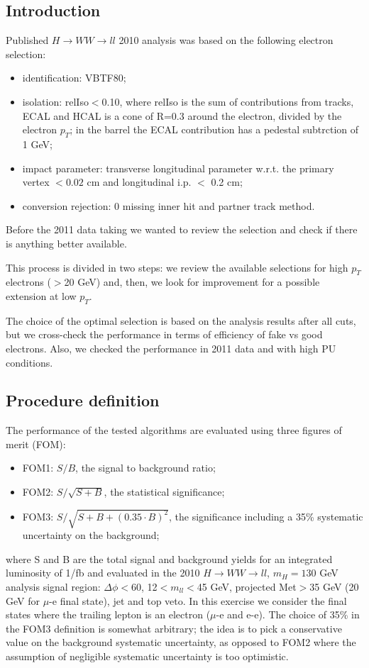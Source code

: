 \subsection{Introduction}
Published $H\rightarrow WW\rightarrow ll$ 2010 analysis was based on the following electron selection:
\begin{itemize}
\item identification: VBTF80;
\item isolation: relIso$<$0.10, where relIso is the sum of contributions from tracks, ECAL and HCAL is a cone of R=0.3 around the electron, 
divided by the electron $p_T$; in the barrel the ECAL contribution has a pedestal subtrction of 1 GeV;
\item impact parameter: transverse longitudinal parameter w.r.t. the primary vertex $<0.02$ cm and longitudinal i.p. $<$ 0.2 cm;
\item conversion rejection: 0 missing inner hit and partner track method.
\end{itemize}
Before the 2011 data taking we wanted to review the selection and check if there is anything better available.

This process is divided in two steps: we review the available selections for high $p_T$ electrons ($>$20 GeV) and, then, 
we look for improvement for a possible extension at low $p_T$.

The choice of the optimal selection is based on the analysis results after all cuts, 
but we cross-check the performance in terms of efficiency of fake vs good electrons.
Also, we checked the performance in 2011 data and with high PU conditions.

\subsection{Procedure definition}
The performance of the tested algorithms are evaluated using three figures of merit (FOM):
\begin{itemize}
\item FOM1: $S/B$, the signal to background ratio;
\item FOM2: $S/\sqrt{S+B}$, the statistical significance;
\item FOM3: $S/\sqrt{S+B+(0.35 \cdot B)^2}$, the significance including a 35\% systematic uncertainty on the background;
\end{itemize}
where S and B are the total signal and background yields for an integrated luminosity of 1/fb and evaluated in the 2010 
$H\rightarrow WW\rightarrow ll$, $m_H=130$ GeV analysis signal region:
$\Delta\phi < 60$, 12$< m_{ll} <$45 GeV, projected Met$>$35 GeV (20 GeV for $\mu$-e final state), jet and top veto.
In this exercise we consider the final states where the trailing lepton is an electron ($\mu$-e and e-e).
The choice of 35\% in the FOM3 definition is somewhat arbitrary; the idea is to pick a conservative value on the background systematic uncertainty, 
as opposed to FOM2 where the assumption of negligible systematic uncertainty is too optimistic.

